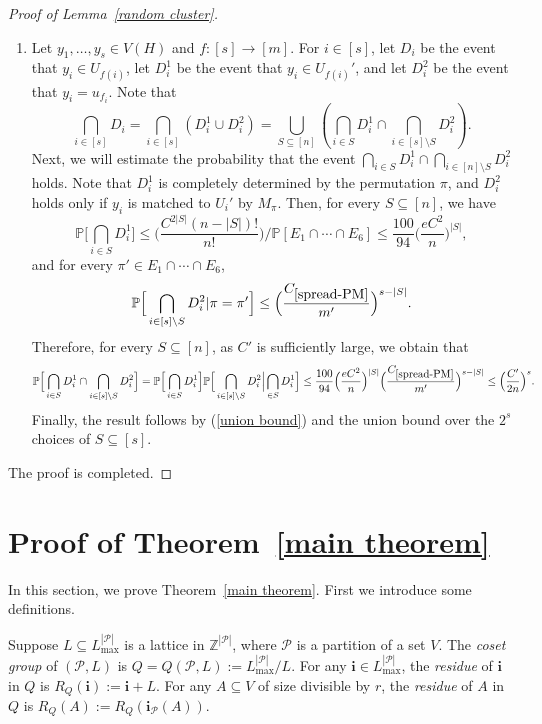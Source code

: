 \documentclass[11pt, letterpaper]{amsart}
\theoremstyle{plain}
\numberwithin{equation}{section}
\theoremstyle{definition}
\renewcommand{\vec}[1]{{\mathbf #1}}
\begin{document}
\begin{proof}[Proof of Lemma~\ref{random cluster}]
\begin{enumerate}[label=(\arabic*)]
            \item Let $y_1,\dots,y_s\in V(H)$ and $f:[s]\rightarrow[m]$. For $i\in [s]$, let $D_i$ be the event that $y_i\in U_{f(i)}$, let $D_i^1$ be the event that $y_i\in U_{f(i)}'$, and let $D_i^2$ be the event that $y_i=u_{f_i}$. Note that 
            \begin{equation}\label{union bound}
                \bigcap_{i\in[s]}D_i=\bigcap_{i\in[s]}\left(D_i^1\cup D_i^2\right)=\bigcup_{S\subseteq [n]}\left(\bigcap_{i\in S}D_i^1\cap\bigcap_{i\in [s]\setminus S}D_i^2 \right).
            \end{equation}
            Next, we will estimate the probability that the event $\bigcap_{i\in S}D_i^1\cap\bigcap_{i\in [n]\setminus S}D_i^2$ holds. Note that $D_i^1$ is completely determined by the permutation $\pi$, and $D_i^2$ holds only if $y_i$ is matched to $U_i'$ by $M_{\pi}$. Then, for every $S\subseteq [n]$, we have
\[
\mathbb{P}\Big[\bigcap_{i\in S}D_i^1\Big]\le \Big(\frac{C^{2|S|}(n-|S|)!}{n!}\Big)/\mathbb{P}[E_1\cap\cdots \cap E_6]\le\frac{100}{94}\Big(\frac{eC^2}{n}\Big)^{|S|},
\]
            and for every $\pi'\in E_1\cap\cdots \cap E_6$, 
\[
\mathbb{P}\Big[\bigcap_{i\in [s]\setminus S}D_i^2|\pi=\pi'\Big]\le\Big(\frac{C_{\ref{spread-PM}}}{m'}\Big)^{s-|S|}.
\]
Therefore, for every $S\subseteq [n]$, as $C'$ is sufficiently large, we obtain that
\[
\mathbb{P}\Big[\bigcap_{i\in S}D_i^1\cap\bigcap_{i\in [s]\setminus S}D_i^2\Big]=\mathbb{P}\Big[\bigcap_{i\in S}D_i^1\Big]\mathbb{P}\Big[\bigcap_{i\in [s]\setminus S}D_i^2\Big|\bigcap_{\in S}D_i^1\Big]\le \frac{100}{94}\Big(\frac{eC^2}{n}\Big)^{|S|}\Big(\frac{C_{\ref{spread-PM}}}{m'}\Big)^{s-|S|}\le \Big({\frac{C'}{2n}}\Big)^s.
\]
            Finally, the result follows by (\ref{union bound}) and the union bound over the $2^s$ choices of $S\subseteq [s]$.
        \end{enumerate}
The proof is completed.
    \end{proof}
	 \section{Proof of Theorem~\ref{main theorem}}\label{spreadness frm vertex spreadness}

In this section, we prove Theorem~\ref{main theorem}.
First we introduce some definitions. 
      
Suppose \(L \subseteq L^{|\mathcal{P}|}_{\text{max}}\) is a lattice in \(\mathbb{Z}^{|\mathcal{P}|}\), where \(\mathcal{P}\) is a partition of a set \(V\). 
The \emph{coset group} of \((\mathcal{P}, L)\) is \(Q = Q(\mathcal{P}, L):=L^{|\mathcal{P}|}_{\text{max}}/L\). 
For any \(\vec{i}\in L^{|\mathcal{P}|}_{\text{max}}\), the \emph{residue} of \(\mathbf{i}\) in \(Q\) is \(R_Q(\mathbf{i}) := \mathbf{i} + L.\) 
For any \(A \subseteq V\) of size divisible by \(r\), the \emph{residue} of \(A\) in \(Q\) is \(R_Q(A) := R_Q(\mathbf{i}_{\mathcal{P}}(A)).\) 
     
\end{document}
